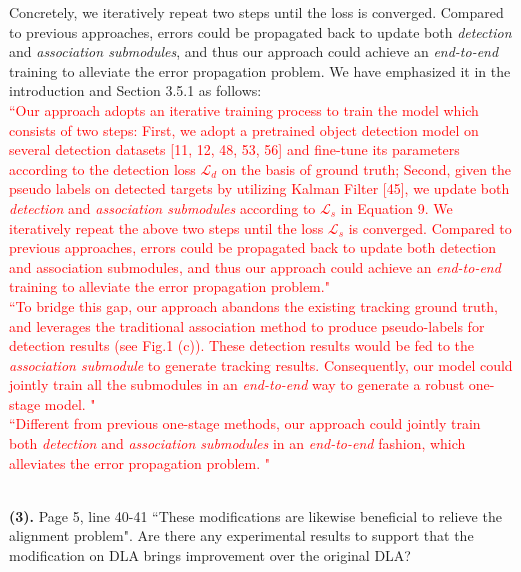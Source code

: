 \documentclass[12pt,journal,onecolumn]{IEEEtran}
\begin{document}
{Concretely, we iteratively repeat two steps until the loss is converged.
Compared to previous approaches, errors could be propagated back to update both \emph{detection} and \emph{association submodules},
and thus our approach could achieve an \emph{end-to-end} training to alleviate the error propagation problem.
We have emphasized it in the introduction and Section 3.5.1 as follows: \\
\textcolor{red}{
``Our approach adopts an iterative training process to train the model which consists of two steps:
First, we adopt a pretrained object detection model on several detection datasets [11, 12, 48, 53, 56] and fine-tune its parameters according to the detection loss $\mathcal{L}_{d}$ on the basis of ground truth; 
Second, given the pseudo labels on detected targets by utilizing Kalman Filter [45], 
we update both \emph{detection} and \emph{association submodules} according to $\mathcal{L}_{s}$ in Equation 9.
We iteratively repeat the above two steps until the loss $\mathcal{L}_{s}$ is converged.
Compared to previous approaches, errors could be propagated back to update both detection and association submodules,
and thus our approach could achieve an \emph{end-to-end} training to alleviate the error propagation problem." \\
``To bridge this gap, our approach abandons the existing tracking ground truth,
and leverages the traditional association method to produce pseudo-labels for detection results (see Fig.1 (c)). 
These detection results would be fed to the \emph{association submodule} to generate tracking results. 
Consequently, our model could jointly train all the submodules in an \emph{end-to-end} way to generate a robust one-stage model. " \\
``Different from previous one-stage methods, our approach could jointly train both \emph{detection} and \emph{association submodules} in an \emph{end-to-end} fashion,
which alleviates the error propagation problem. "
}
}
\\ \\

\vspace{8pt}


\textbf{(3).} Page 5, line 40-41 ``These modifications are likewise beneficial to relieve the alignment problem". 
Are there any experimental results to support that the modification on DLA brings improvement over the original DLA?
\end{document}
